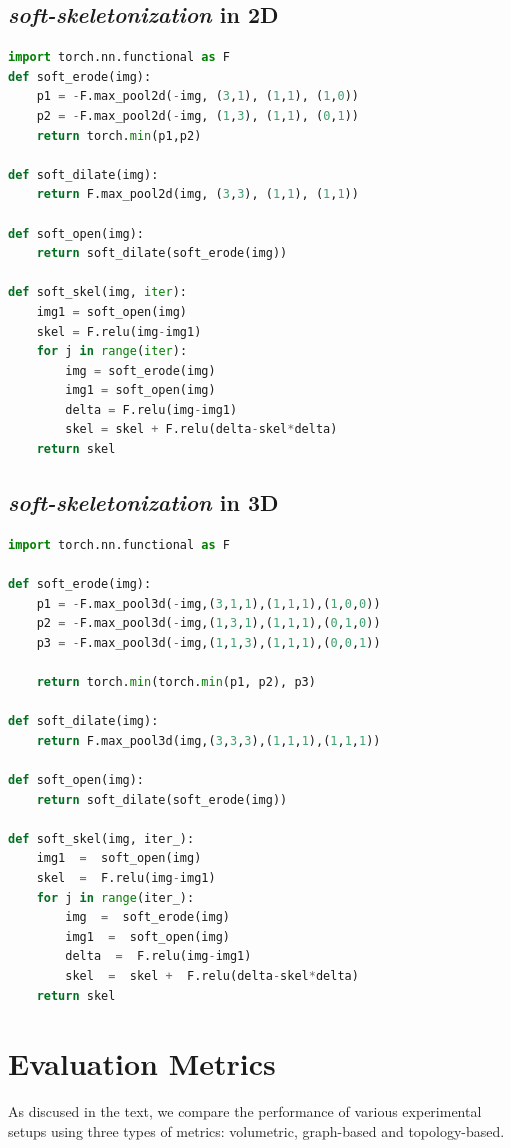 \subsection{\textit{soft-skeletonization} in 2D}
\begin{lstlisting}[language=Python]
import torch.nn.functional as F
def soft_erode(img):
    p1 = -F.max_pool2d(-img, (3,1), (1,1), (1,0))
    p2 = -F.max_pool2d(-img, (1,3), (1,1), (0,1))
    return torch.min(p1,p2)

def soft_dilate(img):
    return F.max_pool2d(img, (3,3), (1,1), (1,1))

def soft_open(img):
    return soft_dilate(soft_erode(img))
    
def soft_skel(img, iter):
    img1 = soft_open(img)
    skel = F.relu(img-img1)
    for j in range(iter):
        img = soft_erode(img)
        img1 = soft_open(img)
        delta = F.relu(img-img1)
        skel = skel + F.relu(delta-skel*delta)
    return skel
\end{lstlisting}

\subsection{\textit{soft-skeletonization} in 3D}
\begin{lstlisting}[language=Python]
import torch.nn.functional as F

def soft_erode(img):
    p1 = -F.max_pool3d(-img,(3,1,1),(1,1,1),(1,0,0))
    p2 = -F.max_pool3d(-img,(1,3,1),(1,1,1),(0,1,0))
    p3 = -F.max_pool3d(-img,(1,1,3),(1,1,1),(0,0,1))

    return torch.min(torch.min(p1, p2), p3)

def soft_dilate(img):
    return F.max_pool3d(img,(3,3,3),(1,1,1),(1,1,1))

def soft_open(img):
    return soft_dilate(soft_erode(img))

def soft_skel(img, iter_):
    img1  =  soft_open(img)
    skel  =  F.relu(img-img1)
    for j in range(iter_):
        img  =  soft_erode(img)
        img1  =  soft_open(img)
        delta  =  F.relu(img-img1)
        skel  =  skel +  F.relu(delta-skel*delta)
    return skel

\end{lstlisting}
\normalsize


\section{Evaluation Metrics}
\noindent As discused in the text, we compare the performance of various experimental setups using three types of metrics: volumetric, graph-based and topology-based. 


